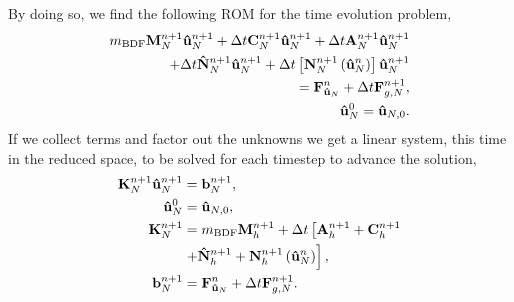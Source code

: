 \documentclass[../../thesis.tex]{subfiles}
\newcommand{\dt}{\ensuremath{\Delta t}}
\newcommand{\Ah}[1]{\ensuremath{\vb{#1}^{n+1}_h}}
\begin{document}
By doing so, we find the following ROM for the time evolution problem,
\begin{subequations}
    \label{eq:1d_rom_weak_formulation_discrete}
    \begin{align}
        m_{\text{BDF}} \vb{M}^{n+1}_{N} \vb{\hat{u}}_{N}^{n+1}
        + \dt \vb{C}^{n+1}_{N} \vb{\hat{u}}_{N}^{n+1}
        + \dt \vb{A}^{n+1}_{N} \vb{\hat{u}}_{N}^{n+1}
        \nonumber 
        \\ 
        + \dt \vb{\hat{N}}^{n+1}_{N} \vb{\hat{u}}_{N}^{n+1}
        + \dt \left[\vb{N}^{n+1}_{N}\left(\vb{\hat{u}}_{N}^{n}\right)\right] \vb{\hat{u}}_{N}^{n+1}
        \nonumber
        \\
        = \vb{F}_{\vb{\hat{u}}_{N}}^{n}
        + \dt \vb{F}_{g,N}^{n+1},
        \\
        \vb{\hat{u}}_N^{0} = \vb{\hat{u}}_{N,0}.
    \end{align}
\end{subequations}
If we collect terms and factor out the unknowns we get a linear system, 
this time in the reduced space, to be solved for each timestep to advance the solution,
\begin{subequations}
    \label{eq:1d_rom_linear_system_timestep}
    \begin{align}
        \vb{K}_{N}^{n+1} \vb{\hat{u}}_{N}^{n+1} &= \vb{b}_{N}^{n+1}, 
        \\
        \vb{\hat{u}}_{N}^{0} &= \vb{\hat{u}}_{N,0},
        \\
        \vb{K}_{N}^{n+1} &= m_{\text{BDF}} \Ah{M} + \dt \left[\Ah{A} + \Ah{C} \right. 
        \nonumber 
        \\
                        &\left. + \Ah{\hat{N}} + \Ah{N}\left(\vb{\hat{u}}_{N}^{n}\right)\right],
        \\
        \vb{b}_{N}^{n+1} &= \vb{F}_{\vb{\hat{u}}_{N}}^{n} + \dt \vb{F}_{g,N}^{n+1}.
    \end{align}
\end{subequations}
\end{document}

